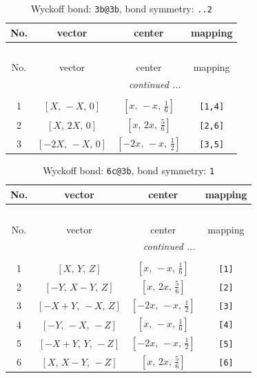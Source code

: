 \documentclass[fleqn,8pt]{jsarticle}
\begin{document}
\renewcommand{\arraystretch}{1.2}
\begin{longtable}{cccc}
\caption{Wyckoff bond: {\tt 3b@3b}, bond symmetry: {\tt ..2}}
 \\
 \hline \hline
No. & vector & center & mapping \\ \hline \endfirsthead

\multicolumn{3}{l}{\tablename\ \thetable{}} \\
 \hline \hline
No. & vector & center & mapping \\ \hline \endhead

 \hline \hline
\multicolumn{3}{r}{\footnotesize\it continued ...} \\ \endfoot

 \hline \hline
\multicolumn{3}{r}{} \\ \endlastfoot

1 & $\left[ X,\, - X,\, 0 \right]$ & $\left[ x,\, - x,\, \frac{1}{6} \right]$ & {\tt [1,4]} \\ \hline
2 & $\left[ X,\, 2 X,\, 0 \right]$ & $\left[ x,\, 2 x,\, \frac{5}{6} \right]$ & {\tt [2,6]} \\ \hline
3 & $\left[ - 2 X,\, - X,\, 0 \right]$ & $\left[ - 2 x,\, - x,\, \frac{1}{2} \right]$ & {\tt [3,5]} \\
\end{longtable}
\renewcommand{\arraystretch}{1.2}
\begin{longtable}{cccc}
\caption{Wyckoff bond: {\tt 6c@3b}, bond symmetry: {\tt 1}}
 \\
 \hline \hline
No. & vector & center & mapping \\ \hline \endfirsthead

\multicolumn{3}{l}{\tablename\ \thetable{}} \\
 \hline \hline
No. & vector & center & mapping \\ \hline \endhead

 \hline \hline
\multicolumn{3}{r}{\footnotesize\it continued ...} \\ \endfoot

 \hline \hline
\multicolumn{3}{r}{} \\ \endlastfoot

1 & $\left[ X,\, Y,\, Z \right]$ & $\left[ x,\, - x,\, \frac{1}{6} \right]$ & {\tt [1]} \\ \hline
2 & $\left[ - Y,\, X - Y,\, Z \right]$ & $\left[ x,\, 2 x,\, \frac{5}{6} \right]$ & {\tt [2]} \\ \hline
3 & $\left[ - X + Y,\, - X,\, Z \right]$ & $\left[ - 2 x,\, - x,\, \frac{1}{2} \right]$ & {\tt [3]} \\ \hline
4 & $\left[ - Y,\, - X,\, - Z \right]$ & $\left[ x,\, - x,\, \frac{1}{6} \right]$ & {\tt [4]} \\ \hline
5 & $\left[ - X + Y,\, Y,\, - Z \right]$ & $\left[ - 2 x,\, - x,\, \frac{1}{2} \right]$ & {\tt [5]} \\ \hline
6 & $\left[ X,\, X - Y,\, - Z \right]$ & $\left[ x,\, 2 x,\, \frac{5}{6} \right]$ & {\tt [6]} \\
\end{longtable}
\end{document}
